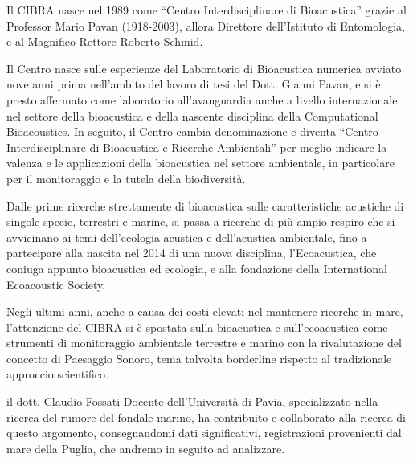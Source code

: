 Il CIBRA nasce nel 1989 come “Centro Interdisciplinare di Bioacustica” grazie al Professor Mario Pavan (1918-2003), allora Direttore dell'Istituto di Entomologia, e al Magnifico Rettore Roberto Schmid. 

Il Centro nasce sulle esperienze del Laboratorio di Bioacustica numerica avviato nove anni prima nell’ambito del lavoro di tesi del Dott. Gianni Pavan, e si è presto affermato come laboratorio all'avanguardia anche a livello internazionale nel settore della bioacustica e della nascente disciplina della Computational Bioacoustics. In seguito, il Centro cambia denominazione e diventa “Centro Interdisciplinare di Bioacustica e Ricerche Ambientali” per meglio indicare la valenza e le applicazioni della bioacustica nel settore ambientale, in particolare per il monitoraggio e la tutela della biodiversità.

Dalle prime ricerche strettamente di bioacustica sulle caratteristiche acustiche di singole specie, terrestri e marine, si passa a ricerche di più ampio respiro che si avvicinano ai temi dell'ecologia acustica e dell'acustica ambientale, fino a partecipare alla nascita nel 2014 di una nuova disciplina, l’Ecoacustica, che coniuga appunto bioacustica ed ecologia, e alla fondazione della International Ecoacoustic Society.

Negli ultimi anni, anche a causa dei costi elevati nel mantenere ricerche in mare, l'attenzione del CIBRA si è spostata sulla bioacustica e sull’ecoacustica come strumenti di monitoraggio ambientale terrestre e marino con la rivalutazione del concetto di Paesaggio Sonoro, tema talvolta borderline rispetto al tradizionale approccio scientifico.

il dott. Claudio Fossati Docente dell'Università di Pavia, specializzato nella ricerca del rumore del fondale marino, ha contribuito e collaborato alla ricerca di questo argomento, consegnandomi dati significativi, registrazioni provenienti dal mare della Puglia, che andremo in seguito ad analizzare. 

